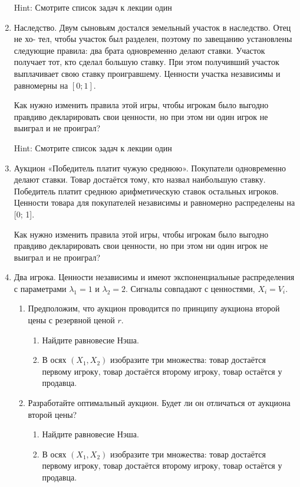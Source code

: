 \begin{enumerate}
Hint: Смотрите список задач к лекции один

\item Наследство. Двум сыновьям достался земельный участок в наследство. Отец не хо-
тел, чтобы участок был разделен, поэтому по завещанию установлены следующие правила: два брата одновременно делают ставки. Участок получает тот, кто сделал большую ставку. При этом получивший участок выплачивает свою ставку проигравшему.
Ценности участка независимы и равномерны на $[0; 1]$.

Как нужно изменить правила этой игры, чтобы игрокам было выгодно правдиво декларировать свои ценности, но при этом ни один игрок не выиграл и не проиграл?

Hint: Смотрите список задач к лекции один

\item Аукцион «Победитель платит чужую среднюю». Покупатели одновременно делают
ставки. Товар достаётся тому, кто назвал наибольшую ставку. Победитель платит
среднюю арифметическую ставок остальных игроков. Ценности товара для покупателей независимы и равномерно распределены на [0; 1].

Как нужно изменить правила этой игры, чтобы игрокам было выгодно правдиво декларировать свои ценности, но при этом ни один игрок не выиграл и не проиграл?

\item Два игрока. Ценности независимы и имеют экспоненциальные распределения с параметрами $ \lambda_{1}=1 $ и $\lambda_{2}=2  $. Сигналы совпадают с ценностями,  $ X_{i}=V_{i} $.

\begin{enumerate}
\item Предположим, что аукцион проводится по принципу аукциона второй цены с резервной ценой $ r $.
\begin{enumerate}
\item Найдите равновесие Нэша.
\item В осях $ (X_{1},X_{2}) $ изобразите три множества: товар достаётся первому игроку, товар достаётся второму игроку, товар остаётся у продавца.
\end{enumerate}
\item Разработайте оптимальный аукцион. Будет ли он отличаться от аукциона второй цены?
\begin{enumerate}
\item Найдите равновесие Нэша.
\item В осях $ (X_{1},X_{2}) $ изобразите три множества: товар достаётся первому игроку, товар достаётся второму игроку, товар остаётся у продавца.
\end{enumerate}
\end{enumerate}


\end{enumerate}
